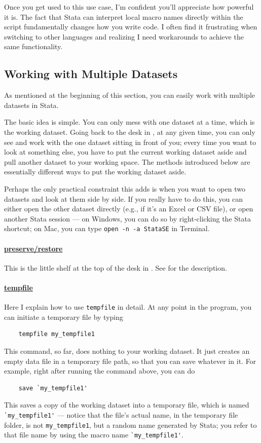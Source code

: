 Once you get used to this use case, I’m confident you’ll appreciate how powerful it is. The fact that Stata can interpret local macro names directly within the script fundamentally changes how you write code. I often find it frustrating when switching to other languages and realizing I need workarounds to achieve the same functionality.

\subsection{Working with Multiple Datasets}
As mentioned at the beginning of this section, you can easily work with multiple datasets in Stata. 

The basic idea is simple. You can only mess with one dataset at a time, which is the working dataset. Going back to the desk in , at any given time, you can only see and work with the one dataset sitting in front of you; every time you want to look at something else, you have to put the current working dataset aside and pull another dataset to your working space. The methods introduced below are essentially different ways to put the working dataset aside. 

Perhaps the only practical constraint this adds is when you want to open two datasets and look at them side by side. If you really have to do this, you can either open the other dataset directly (e.g., if it's an Excel or CSV file), or open another Stata session --- on Windows, you can do so by right-clicking the Stata shortcut; on Mac, you can type \verb|open -n -a StataSE| in Terminal. 

\paragraph{\underline{preserve/restore}} This is the little shelf at the top of the desk in . See  for the description. 

\paragraph{\underline{tempfile}} Here I explain how to use \verb|tempfile| in detail. At any point in the program, you can initiate a temporary file by typing
\begin{verbatim}
    tempfile my_tempfile1 
\end{verbatim}
This command, so far, does nothing to your working dataset. It just creates an empty data file in a temporary file path, so that you can save whatever in it. For example, right after running the command above, you can do 
\begin{verbatim}
    save `my_tempfile1' 
\end{verbatim}
This saves a copy of the working dataset into a temporary file, which is named \verb|`my_tempfile1'| --- notice that the file's actual name, in the temporary file folder, is not \verb|my_tempfile1|, but a random name generated by Stata; you refer to that file name by using the macro name \verb|`my_tempfile1'|. 

